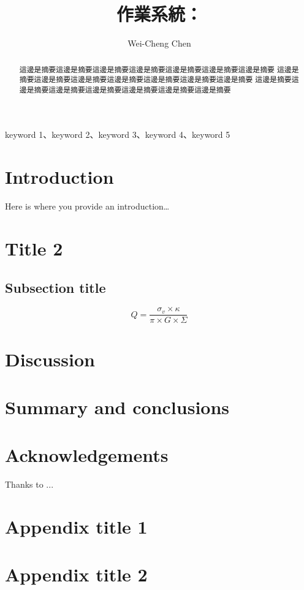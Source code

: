 \documentclass[final,1p,times,authoryear]{elsarticle}
\begin{document}
\begin{CJK*}{UTF8}{bsmi}  %

\begin{frontmatter}

\title{作業系統：}

\author[first]{Wei-Cheng Chen}


\begin{abstract}
這邊是摘要這邊是摘要這邊是摘要這邊是摘要這邊是摘要這邊是摘要這邊是摘要
這邊是摘要這邊是摘要這邊是摘要這邊是摘要這邊是摘要這邊是摘要這邊是摘要
這邊是摘要這邊是摘要這邊是摘要這邊是摘要這邊是摘要這邊是摘要這邊是摘要
\end{abstract}

\vspace{1em}

\begin{keyword}
keyword 1、keyword 2、keyword 3、keyword 4、keyword 5
\end{keyword}
\end{frontmatter}

\section{Introduction}
\label{introduction}
Here is where you provide an introduction…

\section{Title 2}
\subsection{Subsection title}
\begin{equation}
    Q = \frac{\sigma_v \times \kappa}{\pi \times G \times \Sigma}
\end{equation}

\section{Discussion}
\section{Summary and conclusions}

\section*{Acknowledgements}
Thanks to ...

\appendix
\section{Appendix title 1}
\section{Appendix title 2}

 


\end{CJK*}
\end{document}
